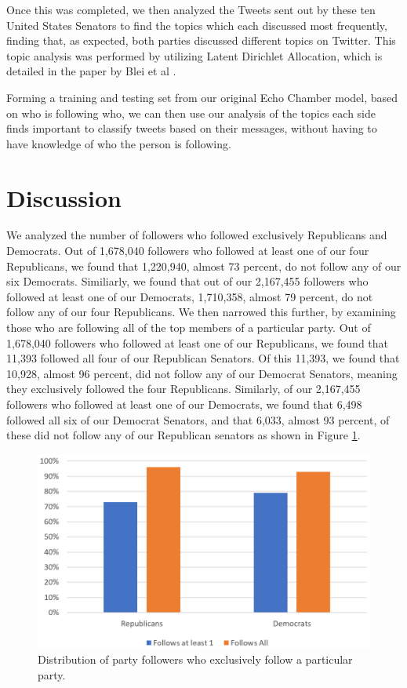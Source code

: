 \documentclass[journal]{IEEEtran}
\begin{document}
	Once this was completed, we then analyzed the Tweets sent out by these ten United States Senators to find the topics which each discussed most frequently, finding that, as expected, both parties discussed different topics on Twitter. This topic analysis was performed by utilizing Latent Dirichlet Allocation, which is detailed in the paper by Blei et al \cite{blei}. 
	
	Forming a training and testing set from our original Echo Chamber model, based on who is following who, we can then use our analysis of the topics each side finds important to classify tweets based on their messages, without having to have knowledge of who the person is following. 
	
	\section{Discussion}	

	We analyzed the number of followers who followed exclusively Republicans and Democrats. Out of 1,678,040 followers who followed at least one of our four Republicans, we found that 1,220,940, almost 73 percent, do not follow any of our six Democrats. Similiarly, we found that out of our 2,167,455 followers who followed at least one of our Democrats, 1,710,358, almost 79 percent, do not follow any of our four Republicans. We then narrowed this further, by examining those who are following all of the top members of a particular party. Out of 1,678,040 followers who followed at least one of our Republicans, we found that 11,393 followed all four of our Republican Senators. Of this 11,393, we found that 10,928, almost 96 percent, did not follow any of our Democrat Senators, meaning they exclusively followed the four Republicans. Similarly, of our 2,167,455 followers who followed at least one of our Democrats, we found that 6,498 followed all six of our Democrat Senators, and that 6,033, almost 93 percent, of these did not follow any of our Republican senators as shown in Figure \ref{fig:PartyFollowers}.

\begin{figure}[htp]
  \includegraphics[width=0.9\linewidth]{partyFollowers.png}
  \caption{Distribution of party followers who exclusively follow a particular party.}
  \label{fig:PartyFollowers}
\end{figure}
\end{document}
